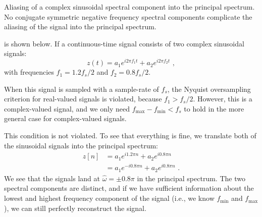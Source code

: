 \begin{marginfigure}
\begin{center}
\end{center}
\caption{Aliasing of a complex sinusoidal spectral component into the principal spectrum. No conjugate symmetric negative frequency spectral components complicate the aliasing of the signal into the principal spectrum.}
\label{fig:complex_aliasing}
\end{marginfigure}

 is shown below. If a continuous-time signal consists of two complex sinusoidal signals:
\begin{equation}
z(t)=a_1 e^{i 2\pi f_1 t} + a_2 e^{i 2\pi f_2 t}\,\,,
\end{equation}
with frequencies $f_1= 1.2 f_s/2$ and $f_2=0.8 f_s/2$.

When this signal is sampled with a sample-rate of $f_s$, the Nyquist oversampling criterion for real-valued signals is violated, because $f_1 > f_s/2$. 
However, this is a complex-valued signal, and we only need $f_{\mathrm{max}} - f_{\mathrm{min}} < f_s$ to hold in the more general case for complex-valued signals.

This condition is not violated. To see that everything is fine, we
translate both of the sinusoidal signals into the principal spectrum:
\begin{align}
z[n] &= a_1 e^{i 1.2\pi n }+ a_2 e^{i 0.8\pi n }\\
     &= a_1 e^{-i 0.8\pi n }+ a_2 e^{i 0.8\pi n }\,\,. 
\end{align}
We see that the signals land at $\hat{\omega} = \pm 0.8\pi$ in the
principal spectrum. The two spectral components are distinct, and if we have sufficient information about the lowest and highest frequency component of the signal (i.e., we know $f_{\mathrm{min}}$ and $f_{\mathrm{max}}$), we can still perfectly reconstruct the signal.

